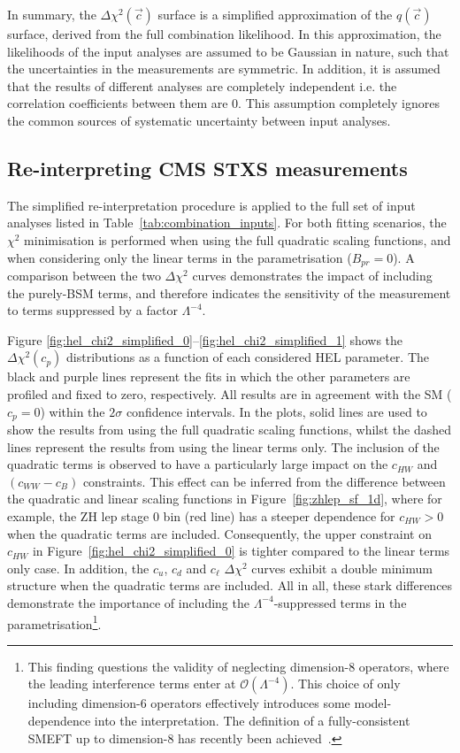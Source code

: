 In summary, the $\Delta\chi^2(\vec{c})$ surface is a simplified approximation of the $q(\vec{c})$ surface, derived from the full combination likelihood. In this approximation, the likelihoods of the input analyses are assumed to be Gaussian in nature, such that the uncertainties in the measurements are symmetric. In addition, it is assumed that the results of different analyses are completely independent i.e. the correlation coefficients between them are 0. This assumption completely ignores the common sources of systematic uncertainty between input analyses.

\subsection{Re-interpreting CMS STXS measurements}\label{sec:hel_simplified_cms}
The simplified re-interpretation procedure is applied to the full set of input analyses listed in Table~\ref{tab:combination_inputs}. For both fitting scenarios, the $\chi^2$ minimisation is performed when using the full quadratic scaling functions, and when considering only the linear terms in the parametrisation ($B_{pr}=0$). A comparison between the two $\Delta\chi^2$ curves demonstrates the impact of including the purely-BSM terms, and therefore indicates the sensitivity of the measurement to terms suppressed by a factor $\Lambda^{-4}$. 

Figure \ref{fig:hel_chi2_simplified_0}--\ref{fig:hel_chi2_simplified_1} shows the $\Delta\chi^2(c_p)$ distributions as a function of each considered HEL parameter. The black and purple lines represent the fits in which the other parameters are profiled and fixed to zero, respectively. All results are in agreement with the SM ($c_p=0$) within the $2\sigma$ confidence intervals. In the plots, solid lines are used to show the results from using the full quadratic scaling functions, whilst the dashed lines represent the results from using the linear terms only. The inclusion of the quadratic terms is observed to have a particularly large impact on the $c_{HW}$ and $(c_{WW}-c_B)$ constraints. This effect can be inferred from the difference between the quadratic and linear scaling functions in Figure~\ref{fig:zhlep_sf_1d}, where for example, the ZH lep stage 0 bin (red line) has a steeper dependence for $c_{HW}>0$ when the quadratic terms are included. Consequently, the upper constraint on $c_{HW}$ in Figure~\ref{fig:hel_chi2_simplified_0} is tighter compared to the linear terms only case. In addition, the $c_u$, $c_d$ and $c_{\ell}$ $\Delta\chi^2$ curves exhibit a double minimum structure when the quadratic terms are included. All in all, these stark differences demonstrate the importance of including the $\Lambda^{-4}$-suppressed terms in the parametrisation\footnote{This finding questions the validity of neglecting dimension-8 operators, where the leading interference terms enter at $\mathcal{O}(\Lambda^{-4})$. This choice of only including dimension-6 operators effectively introduces some model-dependence into the interpretation. The definition of a fully-consistent SMEFT up to dimension-8 has recently been achieved~\cite{}.}.

